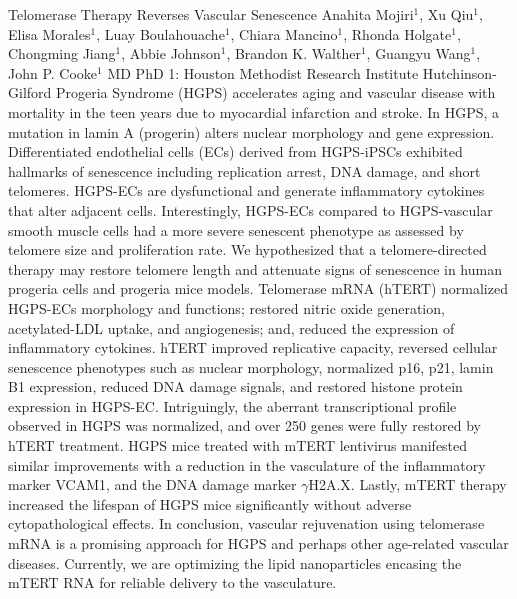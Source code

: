 \vspace{1.5ex}
\abs
{Telomerase Therapy Reverses Vascular Senescence}
{Anahita Mojiri$^{1}$, Xu Qiu$^{1}$, Elisa Morales$^{1}$, Luay Boulahouache$^{1}$, Chiara Mancino$^{1}$, Rhonda Holgate$^{1}$, Chongming Jiang$^{1}$, Abbie Johnson$^{1}$, Brandon K. Walther$^{1}$, Guangyu Wang$^{1}$, John P. Cooke$^{1}$ MD PhD}
{1: Houston Methodist Research Institute}
{Hutchinson-Gilford Progeria Syndrome (HGPS) accelerates aging and vascular disease with mortality in the teen years due to myocardial infarction and stroke. In HGPS, a mutation in lamin A (progerin) alters nuclear morphology and gene expression. Differentiated endothelial cells (ECs) derived from HGPS-iPSCs exhibited hallmarks of senescence including replication arrest, DNA damage, and short telomeres. HGPS-ECs are dysfunctional and generate inflammatory cytokines that alter adjacent cells. Interestingly, HGPS-ECs compared to HGPS-vascular smooth muscle cells had a more severe senescent phenotype as assessed by telomere size and proliferation rate. We hypothesized that a telomere-directed therapy may restore telomere length and attenuate signs of senescence in human progeria cells and progeria mice models.  Telomerase mRNA (hTERT) normalized HGPS-ECs morphology and functions; restored nitric oxide generation, acetylated-LDL uptake, and angiogenesis; and, reduced the expression of inflammatory cytokines. hTERT improved replicative capacity, reversed cellular senescence phenotypes such as nuclear morphology, normalized p16, p21, lamin B1 expression, reduced DNA damage signals, and restored histone protein expression in HGPS-EC. Intriguingly, the aberrant transcriptional profile observed in HGPS was normalized, and over 250 genes were fully restored by hTERT treatment.  HGPS mice treated with mTERT lentivirus manifested similar improvements with a reduction in the vasculature of the inflammatory marker VCAM1, and the DNA damage marker $\gamma$H2A.X. Lastly, mTERT therapy increased the lifespan of HGPS mice significantly without adverse cytopathological effects. In conclusion, vascular rejuvenation using telomerase mRNA is a promising approach for HGPS and perhaps other age-related vascular diseases. Currently, we are optimizing the lipid nanoparticles encasing the mTERT RNA for reliable delivery to the vasculature.}



